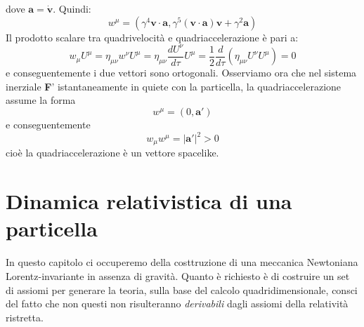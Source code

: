 \documentclass[a4paper,11pt]{book}
\theoremstyle{plain}
\theoremstyle{definition}
\begin{document}
dove $\textbf{a}=\dot{\textbf{v}}$. Quindi:
\[
w^{\mu} = (\gamma^4\textbf{v}\cdot\textbf{a}, \gamma^5(\textbf{v}\cdot\textbf{a})\textbf{v}+\gamma^2\textbf{a})
\]
Il prodotto scalare tra quadrivelocità e quadriaccelerazione è pari a:
\[
w_{\mu}U^{\mu} = \eta_{\mu\nu}w^{\nu}U^{\mu} = \eta_{\mu\nu}\frac{dU^{\nu}}{d\tau}U^{\mu}=\frac{1}{2}\frac{d}{d\tau}(\eta_{\mu\nu}U^{\nu}U^{\mu}) = 0
\]
e conseguentemente i due vettori sono ortogonali. Osserviamo ora che nel sistema inerziale \textbf{F}' istantaneamente in quiete con la particella, la quadriaccelerazione assume la forma
\[
w^{\mu} = (0,\textbf{a}')
\] 
e conseguentemente
\[
w_{\mu}w^{\mu} = |\textbf{a}'|^2 >0
\]
cioè la quadriaccelerazione è un vettore spacelike. 

\chapter{Dinamica relativistica di una particella}

In questo capitolo ci occuperemo della costtruzione di una meccanica Newtoniana Lorentz-invariante in assenza di gravità. Quanto è richiesto è di costruire un set di assiomi per generare la teoria, sulla base del calcolo quadridimensionale, consci del fatto che non questi non risulteranno \emph{derivabili} dagli assiomi della relatività ristretta. 
\end{document}
